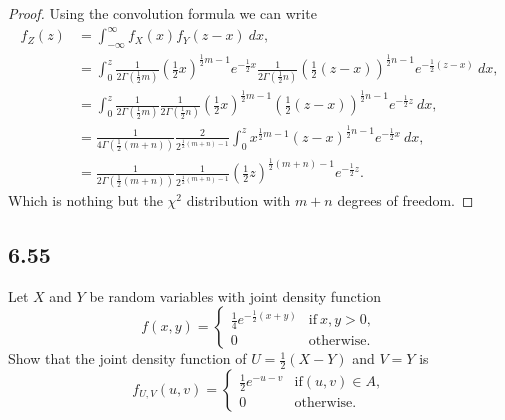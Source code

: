 \documentclass{article}
\begin{document}
\begin{proof}
    Using the convolution formula we can write
    \begin{align*}
        f_Z(z) & = \int_{-\infty}^\infty f_X(x)f_Y(z-x) \ dx,                           \\
               & = \int_0^z
        \frac{1}{2\Gamma(\frac{1}{2}m)}\left(\frac{1}{2}x\right)^{\frac{1}{2}m-1}
        e^{-\frac{1}{2}x}\frac{1}{2\Gamma(\frac{1}{2}n)}
        \left(\frac{1}{2}(z-x)\right)^{\frac{1}{2}n-1}e^{-\frac{1}{2}(z-x)} \ dx,       \\
               & = \int_0^z
        \frac{1}{2\Gamma(\frac{1}{2}m)}\frac{1}{2\Gamma(\frac{1}{2}n)}
        \left(\frac{1}{2}x\right)^{\frac{1}{2}m-1}\left(\frac{1}{2}(z-x)\right)^{\frac{1}{2}n-1}
        e^{-\frac{1}{2}z} \ dx,                                                         \\
               & = \frac{1}{4\Gamma(\frac{1}{2}(m + n))}
        \frac{2}{2^{\frac{1}{2}(m+n)-1}} \int_0^z
        x^{\frac{1}{2}m-1}(z-x)^{\frac{1}{2}n-1}e^{-\frac{1}{2}x} \ dx,                 \\
               & =\frac{1}{2\Gamma(\frac{1}{2}(m + n))}\frac{1}{2^{\frac{1}{2}(m+n)-1}}
        \left(\frac{1}{2}z\right)^{\frac{1}{2}(m+n)-1}e^{-\frac{1}{2}z}.
    \end{align*}
    Which is nothing but the $\chi^2$ distribution with $m+n$ degrees
    of freedom.
\end{proof}

\subsection*{6.55}
Let $X$ and $Y$ be random variables with joint density function
\begin{equation*}
    f(x,y) = \begin{cases}
        \frac{1}{4}e^{-\frac{1}{2}(x+y)} & \text{if} \ x,y>0, \\
        0                                & \text{otherwise.}
    \end{cases}
\end{equation*}
Show that the joint density function of $U=\frac{1}{2}(X-Y)$ and
$V=Y$ is
\begin{equation*}
    f_{U,V}(u,v) = \begin{cases}
        \frac{1}{2}e^{-u-v} & \text{if} (u,v) \in A, \\
        0                   & \text{otherwise}.
    \end{cases}
\end{equation*}
\end{document}
